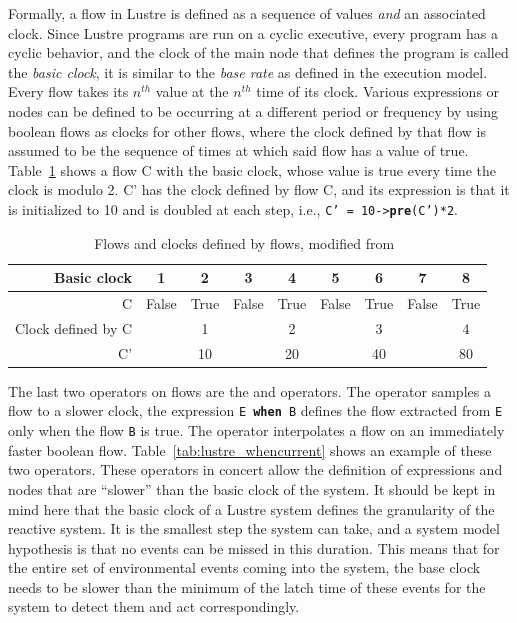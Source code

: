 Formally, a flow in Lustre is defined as a sequence of values
\emph{and} an associated clock. Since Lustre programs are run on a
cyclic executive, every program has a cyclic behavior, and the clock
of the main node that defines the program is called the \emph{basic
  clock}, it is similar to the \emph{base rate} as defined in the
\simu execution model. Every flow takes its $n^{th}$ value at the
$n^{th}$ time of its clock. Various expressions or nodes can be
defined to be occurring at a different period or frequency by using
boolean flows as clocks for other flows, where the clock defined by
that flow is assumed to be the sequence of times at which said flow
has a value of true. Table~\ref{tab:lustre_clocks} shows a flow C with
the basic clock, whose value is true every time the clock is modulo
2. C' has the clock defined by flow C, and its expression is that it
is initialized to 10 and is doubled at each step, i.e., \texttt{C' =
  10->\textbf{pre}(C')*2}.

\begin{table}
\centering
\begin{tabular}{r|c|c|c|c|c|c|c|c}
\hline
Basic clock & 1 & 2 & 3 & 4 & 5 & 6 & 7 & 8\\
\hline
C & False & True & False & True & False & True & False & True\\
\hline
Clock defined by C & & 1 & & 2 & & 3 & & 4\\
\hline
C' & & 10 & & 20 & & 40 & & 80\\
\hline
\end{tabular}
\caption{Flows and clocks defined by flows, modified
  from~\cite{halbwachs@ieee91}}
\label{tab:lustre_clocks}
\end{table}

The last two operators on flows are the  and 
operators. The  operator samples a flow to a slower clock,
the expression \texttt{E \textbf{when} B} defines the flow extracted
from \texttt{E} only when the flow \texttt{B} is true. The
 operator interpolates a flow on an immediately faster
boolean flow. Table~\ref{tab:lustre_whencurrent} shows an example of
these two operators. These operators in concert allow the definition
of expressions and nodes that are ``slower'' than the basic clock of
the system. It should be kept in mind here that the basic clock of a
Lustre system defines the granularity of the reactive system. It is
the smallest step the system can take, and a system model hypothesis
is that no events can be missed in this duration. This means that for
the entire set of environmental events coming into the system, the
base clock needs to be slower than the minimum of the latch time of
these events for the system to detect them and act correspondingly.

